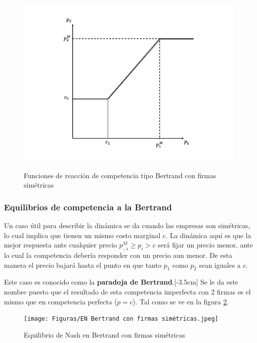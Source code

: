 \begin{figure}[htb]
    \centering
    \caption{Funciones de reacción de competencia tipo Bertrand con firmas simétricas}
    \includegraphics[width=15cm]{Figuras/Función de reacción Bertrand.jpeg}
    \label{fig:funciones de reacción Bertrand}
\end{figure}


\subsubsection{Equilibrios de competencia a la Bertrand}

Un caso útil para describir la dinámica se da cuando las empresas son simétricas, lo cual implica que tienen un mismo costo marginal $c$. La dinámica aquí es que la mejor respuesta ante cualquier precio $p_{-i}^M \geq p_i>c$ será fijar un precio menor, ante lo cual la competencia debería responder con un precio aun menor. De esta manera el precio bajará hasta el punto en que tanto $p_1$ como $p_2$ sean iguales a $c$. 

Este caso es conocido como la \textbf{paradoja de Bertrand}.[-3.5cm] Se le da este nombre puesto que el resultado de esta competencia imperfecta con 2 firmas es el mismo que en competencia perfecta ($p=c$). Tal como se ve en la figura \ref{fig:EN Bertrand sim}. 

\begin{figure}[htb]
    \centering
    \caption{Equilibrio de Nash en Bertrand con firmas simétricas}
    \texttt{[image: Figuras/EN Bertrand con firmas simétricas.jpeg]}
    \label{fig:EN Bertrand sim}
\end{figure}

